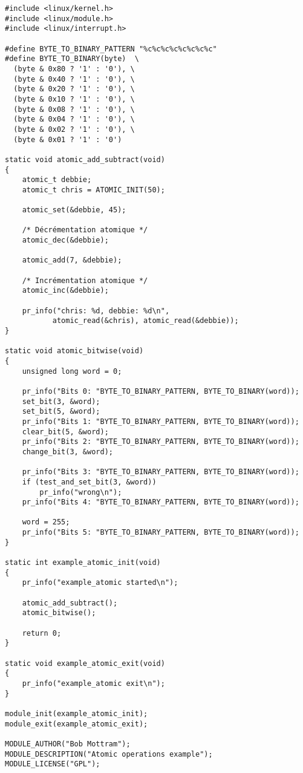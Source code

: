 \documentclass[11pt]{article}
\begin{document}
\begin{verbatim}
#include <linux/kernel.h>
#include <linux/module.h>
#include <linux/interrupt.h>

#define BYTE_TO_BINARY_PATTERN "%c%c%c%c%c%c%c%c"
#define BYTE_TO_BINARY(byte)  \
  (byte & 0x80 ? '1' : '0'), \
  (byte & 0x40 ? '1' : '0'), \
  (byte & 0x20 ? '1' : '0'), \
  (byte & 0x10 ? '1' : '0'), \
  (byte & 0x08 ? '1' : '0'), \
  (byte & 0x04 ? '1' : '0'), \
  (byte & 0x02 ? '1' : '0'), \
  (byte & 0x01 ? '1' : '0')

static void atomic_add_subtract(void)
{
    atomic_t debbie;
    atomic_t chris = ATOMIC_INIT(50);

    atomic_set(&debbie, 45);

    /* Décrémentation atomique */
    atomic_dec(&debbie);

    atomic_add(7, &debbie);

    /* Incrémentation atomique */
    atomic_inc(&debbie);

    pr_info("chris: %d, debbie: %d\n",
           atomic_read(&chris), atomic_read(&debbie));
}

static void atomic_bitwise(void)
{
    unsigned long word = 0;

    pr_info("Bits 0: "BYTE_TO_BINARY_PATTERN, BYTE_TO_BINARY(word));
    set_bit(3, &word);
    set_bit(5, &word);
    pr_info("Bits 1: "BYTE_TO_BINARY_PATTERN, BYTE_TO_BINARY(word));
    clear_bit(5, &word);
    pr_info("Bits 2: "BYTE_TO_BINARY_PATTERN, BYTE_TO_BINARY(word));
    change_bit(3, &word);

    pr_info("Bits 3: "BYTE_TO_BINARY_PATTERN, BYTE_TO_BINARY(word));
    if (test_and_set_bit(3, &word))
        pr_info("wrong\n");
    pr_info("Bits 4: "BYTE_TO_BINARY_PATTERN, BYTE_TO_BINARY(word));

    word = 255;
    pr_info("Bits 5: "BYTE_TO_BINARY_PATTERN, BYTE_TO_BINARY(word));
}

static int example_atomic_init(void)
{
    pr_info("example_atomic started\n");

    atomic_add_subtract();
    atomic_bitwise();

    return 0;
}

static void example_atomic_exit(void)
{
    pr_info("example_atomic exit\n");
}

module_init(example_atomic_init);
module_exit(example_atomic_exit);

MODULE_AUTHOR("Bob Mottram");
MODULE_DESCRIPTION("Atomic operations example");
MODULE_LICENSE("GPL");
\end{verbatim}
\end{document}
